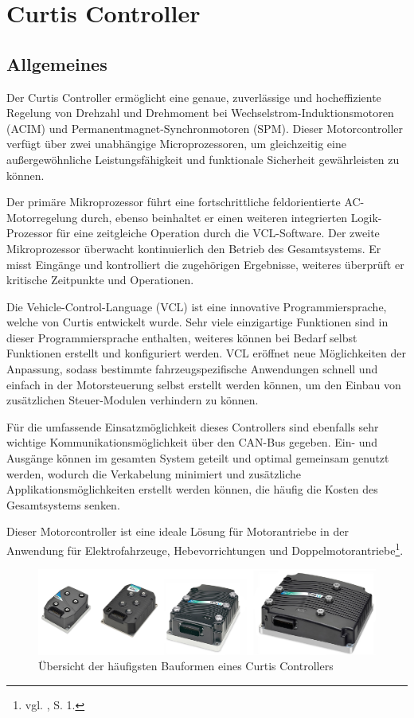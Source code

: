 \newpage

\section{Curtis Controller}
\subsection{Allgemeines}
Der Curtis Controller ermöglicht eine genaue, zuverlässige und hocheffiziente Regelung von Drehzahl und Drehmoment bei Wechselstrom-Induktionsmotoren (ACIM) und Permanentmagnet-Synchronmotoren (SPM). Dieser Motorcontroller verfügt über zwei unabhängige Microprozessoren, um gleichzeitig eine außergewöhnliche Leistungsfähigkeit und funktionale Sicherheit gewährleisten zu können. 

Der primäre Mikroprozessor führt eine fortschrittliche feldorientierte AC-Motorregelung durch, ebenso beinhaltet er einen weiteren integrierten Logik-Prozessor für eine zeitgleiche Operation durch die VCL-Software. Der zweite Mikroprozessor überwacht kontinuierlich den Betrieb des Gesamtsystems. Er misst Eingänge und kontrolliert die zugehörigen Ergebnisse, weiteres überprüft er kritische Zeitpunkte und Operationen. 

Die Vehicle-Control-Language (VCL) ist eine  innovative Programmiersprache, welche von Curtis entwickelt wurde. Sehr viele einzigartige Funktionen sind in dieser Programmiersprache enthalten, weiteres können bei Bedarf selbst Funktionen erstellt und konfiguriert werden. VCL eröffnet neue Möglichkeiten der Anpassung, sodass bestimmte fahrzeugspezifische Anwendungen schnell und einfach in der Motorsteuerung selbst erstellt werden können, um den Einbau von zusätzlichen Steuer-Modulen verhindern zu können.

Für die umfassende Einsatzmöglichkeit dieses Controllers sind ebenfalls sehr wichtige Kommunikationsmöglichkeit über den CAN-Bus gegeben. Ein- und Ausgänge können im gesamten System geteilt und optimal gemeinsam genutzt werden, wodurch die Verkabelung minimiert und zusätzliche Applikationsmöglichkeiten erstellt werden können, die häufig die Kosten des Gesamtsystems senken.

Dieser Motorcontroller ist eine ideale Lösung für Motorantriebe in der Anwendung für Elektrofahrzeuge, Hebevorrichtungen und Doppelmotorantriebe\footnote{vgl. \cite{Manual}, S. 1.}.
\\[10mm]
\begin{figure}[H]
	\begin{center}
		\includegraphics[width=\textwidth]{figures/antrieb/Curtis_Bauformen.png}
		\caption{Übersicht der häufigsten Bauformen eines Curtis Controllers\cite{Manual}}
	\end{center}
\end{figure}



